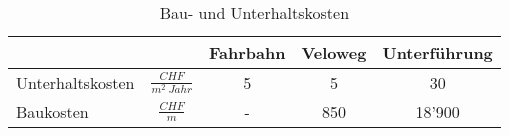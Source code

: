 %
%
%
%

\begin{table}[h!]
\flushleft
\renewcommand{\arraystretch}{1.4}
\begin{tabular}{lc|ccc}
                 &                         & Fahrbahn  & Veloweg  & Unterführung \\ \hline
Unterhaltskosten &$\frac{CHF}{m^2 \ Jahr}$ &     5     &     5    &      30        \\
Baukosten        &$\frac{CHF}{m}$ 		   &     -     &   850    &     18'900        
\end{tabular}
\caption{Bau- und Unterhaltskosten}
\label{tab:t-04-03-01-Unterhalt}
\end{table}

%
%





%


